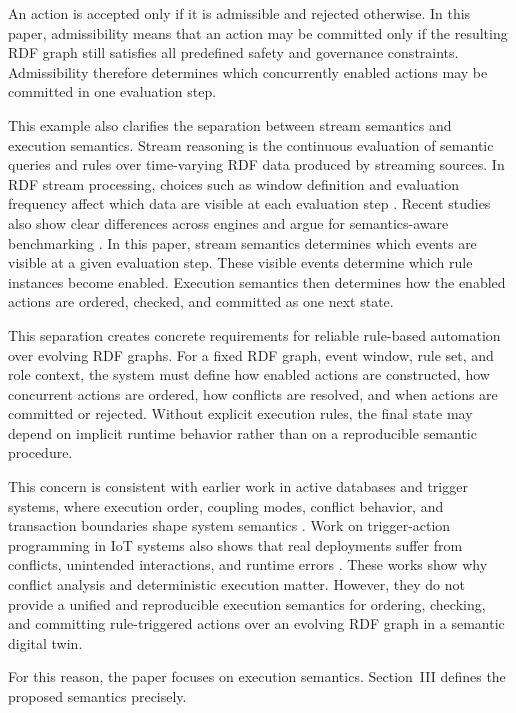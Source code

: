 \documentclass{ieeeaccess}
\theoremstyle{definition}
\theoremstyle{plain}
\theoremstyle{remark}
\begin{document}
An action is accepted only if it is admissible and rejected otherwise. In this paper, admissibility means that an action may be committed only if the resulting RDF graph still satisfies all predefined safety and governance constraints. Admissibility therefore determines which concurrently enabled actions may be committed in one evaluation step.

This example also clarifies the separation between stream semantics and execution semantics. Stream reasoning is the continuous evaluation of semantic queries and rules over time-varying RDF data produced by streaming sources. In RDF stream processing, choices such as window definition and evaluation frequency affect which data are visible at each evaluation step \cite{DellAglio2014RSPQL}. Recent studies also show clear differences across engines and argue for semantics-aware benchmarking \cite{Gruber2023StreamReasoning}. In this paper, stream semantics determines which events are visible at a given evaluation step. These visible events determine which rule instances become enabled. Execution semantics then determines how the enabled actions are ordered, checked, and committed as one next state.

This separation creates concrete requirements for reliable rule-based automation over evolving RDF graphs. For a fixed RDF graph, event window, rule set, and role context, the system must define how enabled actions are constructed, how concurrent actions are ordered, how conflicts are resolved, and when actions are committed or rejected. Without explicit execution rules, the final state may depend on implicit runtime behavior rather than on a reproducible semantic procedure.

This concern is consistent with earlier work in active databases and trigger systems, where execution order, coupling modes, conflict behavior, and transaction boundaries shape system semantics \cite{Paton1999ActiveDatabaseSystems}. Work on trigger-action programming in IoT systems also shows that real deployments suffer from conflicts, unintended interactions, and runtime errors \cite{Chen2024TapChecker,Xing2024CCDFTAP}. These works show why conflict analysis and deterministic execution matter. However, they do not provide a unified and reproducible execution semantics for ordering, checking, and committing rule-triggered actions over an evolving RDF graph in a semantic digital twin.

For this reason, the paper focuses on execution semantics. Section~III defines the proposed semantics precisely.
\end{document}

